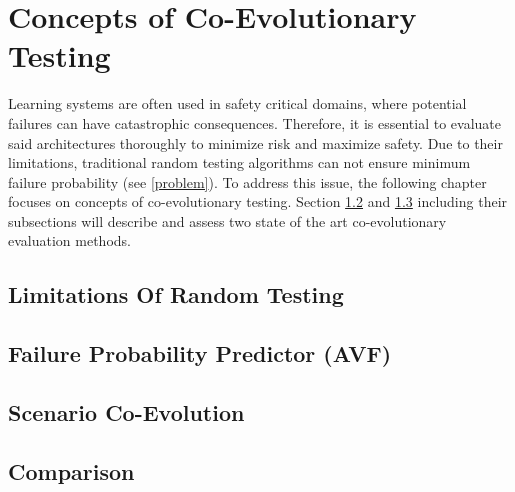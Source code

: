 \section{Concepts of Co-Evolutionary Testing}
\label{testing}
Learning systems are often used in safety critical domains, where potential failures can have catastrophic consequences. Therefore, it is essential to evaluate said architectures thoroughly to minimize risk and maximize safety. Due to their limitations, traditional random testing algorithms can not ensure minimum failure probability (see \ref{problem}). To address this issue, the following chapter focuses on concepts of co-evolutionary testing. Section \ref{avf} and \ref{coevolution} including their subsections will describe and assess two state of the art co-evolutionary evaluation methods.


\subsection{Limitations Of Random Testing}
\label{limitations}



\subsection{Failure Probability Predictor (AVF)}
\label{avf}



\subsection{Scenario Co-Evolution}
\label{coevolution}


\subsection{Comparison}
\label{comparison}
